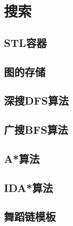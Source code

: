 \section{搜索}

\subsection{STL容器}

\subsection{图的存储}

\subsection{深搜DFS算法}

\subsection{广搜BFS算法}

\subsection{A*算法}

\subsection{IDA*算法}

\subsection{舞蹈链模板}